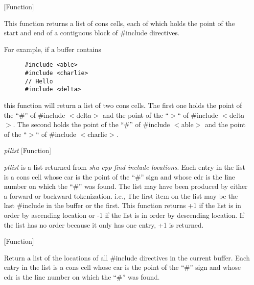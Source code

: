 \vspace{1em}
\noindent
{}
\usebox{\funcname}
 \hfill [Function]

\begin{doc-string}
This function returns a list of cons cells, each of which holds the point of
the start and end of a contiguous block of \#include directives.

For example, if a buffer contains

\small{\begin{verbatim}
      #include <able>
      #include <charlie>
      // Hello
      #include <delta>
\end{verbatim}}

this function will return a list of two cons cells.  The first one holds the
point of the ``\#'' of \#include $<$delta$>$ and the point of the ``$>$`` of \#include
$<$delta$>$.  The second holds the point of the ``\#'' of \#include $<$able$>$ and the
point of the ``$>$`` of \#include $<$charlie$>$.
\end{doc-string}

\vspace{1em}
\noindent
{}
\usebox{\funcname}\emph{pllist}
 \hfill [Function]

\begin{doc-string}
\emph{pllist} is a list returned from \emph{shu-cpp-find-include-locations}.  Each entry in
the list is a cons cell whose car is the point of the ``\#'' sign and whose cdr
is the line number on which the ``\#'' was found.  The list may have been
produced by either a forward or backward tokenization.  i.e., The first item on
the list may be the last \#include in the buffer or the first.  This function
returns +1 if the list is in order by ascending location or -1 if the list is in
order by descending location.  If the list has no order because it only has one
entry, +1 is returned.
\end{doc-string}

\vspace{1em}
\noindent
{}
\usebox{\funcname}
 \hfill [Function]

\begin{doc-string}
Return a list of the locations of all \#include directives in the current
buffer.  Each entry in the list is a cons cell whose car is the point of the
``\#'' sign and whose cdr is the line number on which the ``\#'' was found.
\end{doc-string}

